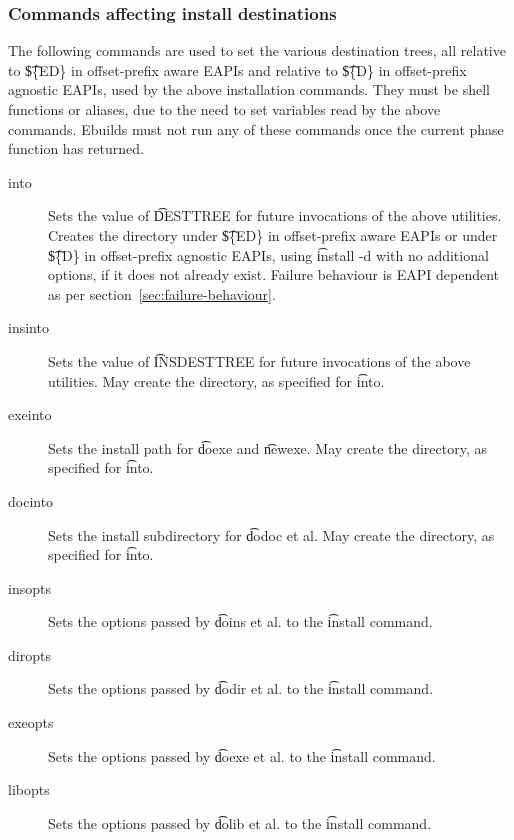 \subsubsection{Commands affecting install destinations}
The following commands are used to set the various destination trees, all relative to \t{\$\{ED\}} in
offset-prefix aware EAPIs and relative to \t{\$\{D\}} in offset-prefix agnostic EAPIs, used by the
above installation commands. They must be shell functions or aliases, due to the need to set variables
read by the above commands. Ebuilds must not run any of these commands once the current phase function
has returned.

\begin{description}

\item[into] Sets the value of \t{DESTTREE} for future invocations
    of the above utilities. Creates the directory under \t{\$\{ED\}}
    in offset-prefix aware EAPIs or under \t{\$\{D\}} in offset-prefix
    agnostic EAPIs, using \t{install -d} with no additional options,
    if it does not already exist. Failure behaviour is EAPI dependent
    as per section~\ref{sec:failure-behaviour}.

\item[insinto] Sets the value of \t{INSDESTTREE} for future invocations of the above utilities. May
    create the directory, as specified for \t{into}.

\item[exeinto] Sets the install path for \t{doexe} and \t{newexe}. May create the directory, as specified
    for \t{into}.

\item[docinto] Sets the install subdirectory for \t{dodoc} et al. May create the directory, as specified
    for \t{into}.

\item[insopts] Sets the options passed by \t{doins} et al. to the \t{install} command.

\item[diropts] Sets the options passed by \t{dodir} et al. to the \t{install} command.

\item[exeopts] Sets the options passed by \t{doexe} et al. to the \t{install} command.

\item[libopts] Sets the options passed by \t{dolib} et al. to the \t{install} command.

\end{description}

